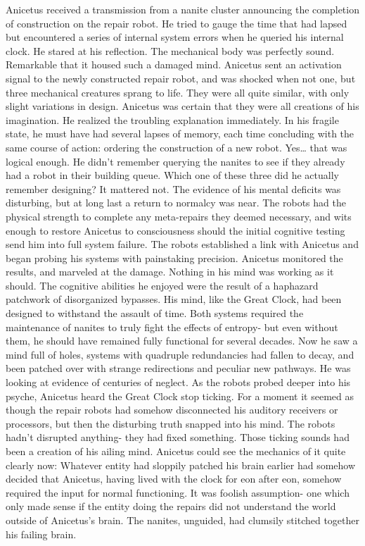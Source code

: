 \documentclass[a4paper]{article}
\begin{document}
Anicetus received a transmission from a nanite cluster announcing the completion of construction on the repair robot. He tried to gauge the time that had lapsed but encountered a series of internal system errors when he queried his internal clock. He stared at his reflection. The mechanical body was perfectly sound. Remarkable that it housed such a damaged mind.
Anicetus sent an activation signal to the newly constructed repair robot, and was shocked when not one, but three mechanical creatures sprang to life. They were all quite similar, with only slight variations in design. Anicetus was certain that they were all creations of his imagination.
He realized the troubling explanation immediately. In his fragile state, he must have had several lapses of memory, each time concluding with the same course of action: ordering the construction of a new robot. Yes… that was logical enough. He didn’t remember querying the nanites to see if they already had a robot in their building queue. Which one of these three did he actually remember designing? It mattered not. The evidence of his mental deficits was disturbing, but at long last a return to normalcy was near.
The robots had the physical strength to complete any meta-repairs they deemed necessary, and wits enough to restore Anicetus to consciousness should the initial cognitive testing send him into full system failure. The robots established a link with Anicetus and began probing his systems with painstaking precision. Anicetus monitored the results, and marveled at the damage.
Nothing in his mind was working as it should. The cognitive abilities he enjoyed were the result of a haphazard patchwork of disorganized bypasses. His mind, like the Great Clock, had been designed to withstand the assault of time. Both systems required the maintenance of nanites to truly fight the effects of entropy- but even without them, he should have remained fully functional for several decades. Now he saw a mind full of holes, systems with quadruple redundancies had fallen to decay, and been patched over with strange redirections and peculiar new pathways. He was looking at evidence of centuries of neglect.
As the robots probed deeper into his psyche, Anicetus heard the Great Clock stop ticking. For a moment it seemed as though the repair robots had somehow disconnected his auditory receivers or processors, but then the disturbing truth snapped into his mind. The robots hadn’t disrupted anything- they had fixed something. Those ticking sounds had been a creation of his ailing mind.
Anicetus could see the mechanics of it quite clearly now: Whatever entity had sloppily patched his brain earlier had somehow decided that Anicetus, having lived with the clock for eon after eon, somehow required the input for normal functioning. It was foolish assumption- one which only made sense if the entity doing the repairs did not understand the world outside of Anicetus’s brain. The nanites, unguided, had clumsily stitched together his failing brain.
\end{document}
